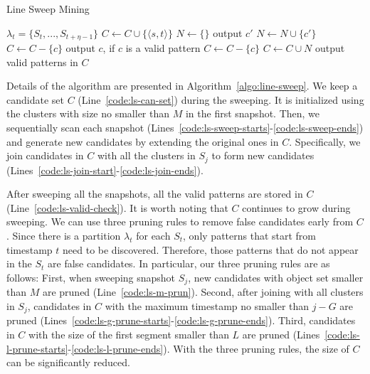 \begin{algorithm}[h]
\caption{Line Sweep Mining}
\label{algo:line-sweep}
\begin{algorithmic}[1]
\Require $\lambda_t = \{S_t, ..., S_{t+\eta-1}\}$
  \label{code:ls-can-set}
\label{code:ls-init-start}
\State $C\leftarrow C\cup \{\langle s, t \rangle \}$
\EndIf
\EndFor
\label{code:ls-init-end}
 \label{code:ls-sweep-starts}
	\State $N \gets \{\}$
	 \label{code:ls-join-start}
		 \label{code:ls-join}
			\State output $c'$
			\State $N\leftarrow N\cup \{c'\}$ \label{code:ls-m-prun}	
		\EndIf
	\EndFor \label{code:ls-join-ends}
		\label{code:ls-g-prune-starts}
			\State $C\leftarrow C-\{c\}$ 
			\State output $c$, if $c$ is a valid pattern
		\EndIf  \label{code:ls-g-prune-ends}
		\label{code:ls-l-prune-starts}
			\State $C\leftarrow C-\{c\}$ 
		\EndIf\label{code:ls-l-prune-ends}
	\EndFor
	\State $C\leftarrow C\cup N$
\EndFor\label{code:ls-sweep-ends}
\State output valid patterns in  $C$  \label{code:ls-valid-check}
\end{algorithmic}
\end{algorithm}


Details of the algorithm are presented in Algorithm~\ref{algo:line-sweep}. We keep a candidate set $C$ (Line~\ref{code:ls-can-set}) during the sweeping. It is initialized using the clusters with size no smaller than $M$ in the first snapshot. Then, we sequentially scan each snapshot (Lines~\ref{code:ls-sweep-starts}-\ref{code:ls-sweep-ends}) and generate new candidates by extending the original ones in $C$.
Specifically, we join candidates in $C$ with all the clusters in $S_j$ to form new candidates (Lines~\ref{code:ls-join-start}-\ref{code:ls-join-ends}). 

After sweeping all the snapshots, all the valid patterns are stored in $C$ (Line~\ref{code:ls-valid-check}). 
It is worth noting that $C$ continues to grow during sweeping. We can use three pruning rules to remove  false candidates early from $C$. Since there is a partition $\lambda_t$ for each $S_t$, only patterns that start from timestamp $t$ need to be discovered. Therefore, those patterns that do not appear in the $S_t$ are false candidates. In particular, our
three pruning rules are as follows:
First, when sweeping snapshot $S_j$, new candidates with object set smaller than $M$ are pruned (Line~\ref{code:ls-m-prun}). Second, after joining with all clusters in $S_j$, 
candidates in $C$ with the maximum timestamp no smaller than $j-G$ are pruned (Lines~\ref{code:ls-g-prune-starts}-\ref{code:ls-g-prune-ends}). Third, candidates in $C$ with the size of the first segment smaller than $L$
are pruned (Lines~\ref{code:ls-l-prune-starts}-\ref{code:ls-l-prune-ends}).  
With the three pruning rules, the size of $C$ can be significantly reduced.  

